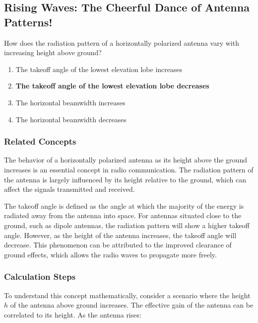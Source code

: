 \subsection{Rising Waves: The Cheerful Dance of Antenna Patterns!}

\begin{tcolorbox}[colback=gray!10, colframe=black, title=E9C13]  
How does the radiation pattern of a horizontally polarized antenna vary with increasing height above ground?

\begin{enumerate}[label=\Alph*]
    \item The takeoff angle of the lowest elevation lobe increases
    \item \textbf{The takeoff angle of the lowest elevation lobe decreases}
    \item The horizontal beamwidth increases
    \item The horizontal beamwidth decreases
\end{enumerate} \end{tcolorbox}

\subsubsection{Related Concepts}

The behavior of a horizontally polarized antenna as its height above the ground increases is an essential concept in radio communication. The radiation pattern of the antenna is largely influenced by its height relative to the ground, which can affect the signals transmitted and received.

The takeoff angle is defined as the angle at which the majority of the energy is radiated away from the antenna into space. For antennas situated close to the ground, such as dipole antennas, the radiation pattern will show a higher takeoff angle. However, as the height of the antenna increases, the takeoff angle will decrease. This phenomenon can be attributed to the improved clearance of ground effects, which allows the radio waves to propagate more freely.

\subsubsection{Calculation Steps}

To understand this concept mathematically, consider a scenario where the height \(h\) of the antenna above ground increases. The effective gain of the antenna can be correlated to its height. As the antenna rises:

